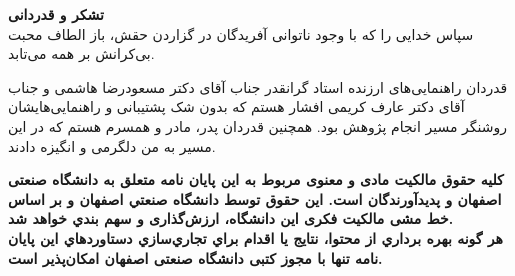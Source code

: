 \restoregeometry
\pagebreak

\thispagestyle{empty}
\vspace*{1.5cm}

{\large
	\textbf{تشکر و قدردانی}\\
	
	
	سپاس خدایی را که با وجود ناتوانی آفریدگان در گزاردن حقش، باز الطاف محبت بی‌کرانش بر همه می‌تابد.
	
	قدردان راهنمایی‌های ارزنده استاد گرانقدر جناب آقای دکتر مسعودرضا هاشمی و جناب آقای دکتر عارف کریمی افشار هستم که بدون شک پشتیبانی و راهنمایی‌هایشان روشنگر مسیر انجام پژوهش بود.
	همچنین قدردان پدر، مادر و همسرم هستم که در این مسیر به من دلگرمی و انگیزه دادند.
	
}
\restoregeometry
\pagebreak

%
%		
%		

\thispagestyle{empty}

\vspace*{3cm}
\textbf{\Large کلیه حقوق مالکیت مادی و معنوی مربوط به اين پايان نامه متعلق به دانشگاه صنعتی اصفهان و پدیدآورندگان است. این حقوق توسط دانشگاه صنعتي اصفهان و بر اساس خط مشی مالکیت فکری این دانشگاه، ارزش‌گذاری و سهم بندي خواهد شد.
\\
			هر گونه بهره برداري از محتوا، نتايج یا اقدام براي تجاري‌سازي دستاوردهاي اين پايان نامه تنها با مجوز کتبی دانشگاه صنعتی اصفهان امکان‌پذیر است.
}


